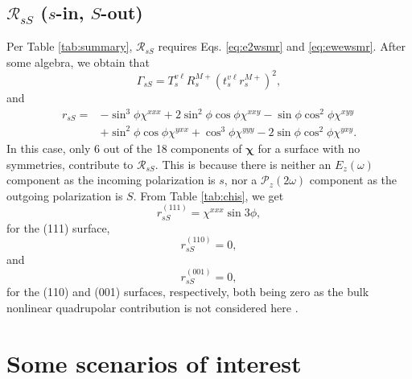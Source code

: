 
\subsection{\texorpdfstring{$\mathcal{R}_{sS}$ ($s$-in, $S$-out)}
{RsS (s-in, S-out)}}
\label{sec:RsS}

Per Table \ref{tab:summary}, $\mathcal{R}_{sS}$ requires Eqs. \eqref{eq:e2wsmr}
and \eqref{eq:ewewsmr}. After some algebra, we obtain that
\begin{equation}
\Gamma_{sS} = 
T_{s}^{v\ell}R^{M+}_{s}\left(t^{v\ell}_{s}r^{M+}_{s}\right)^{2},
\end{equation}
and
\begin{equation}
\begin{split}
r_{sS} = 
&- \sin^{3}\phi\chi^{xxx}
 + 2\sin^{2}\phi\cos\phi\chi^{xxy}
 - \sin\phi\cos^{2}\phi\chi^{xyy}\\
&+ \sin^{2}\phi\cos\phi\chi^{yxx}
 + \cos^{3}\phi\chi^{yyy}
 - 2\sin\phi\cos^{2}\phi\chi^{yxy}.
\end{split}
\end{equation}
In this case, only 6 out of the 18 components of $\boldsymbol{\chi}$ for a
surface with no symmetries, contribute to $\mathcal{R}_{sS}$. This is because
there is neither an $E_{z}(\omega)$ component as the incoming polarization is
$s$, nor a $\mathcal{P}_{z}(2\omega)$ component as the outgoing polarization is
$S$. From Table \ref{tab:chis}, we get
\begin{equation}\label{eq:rss111}
r^{(111)}_{sS} = \chi^{xxx}\sin3\phi,
\end{equation}
for the (111) surface,
\begin{equation}\label{eq:rss110}
r^{(110)}_{sS} = 0,
\end{equation}
and
\begin{equation}\label{eq:rss001}
r^{(001)}_{sS} = 0,
\end{equation}
for the (110) and (001) surfaces, respectively, both being zero as the bulk
nonlinear quadrupolar contribution is not considered here \cite{sipePRB87}.



\section{Some scenarios of interest}\label{sec:scenarios}

